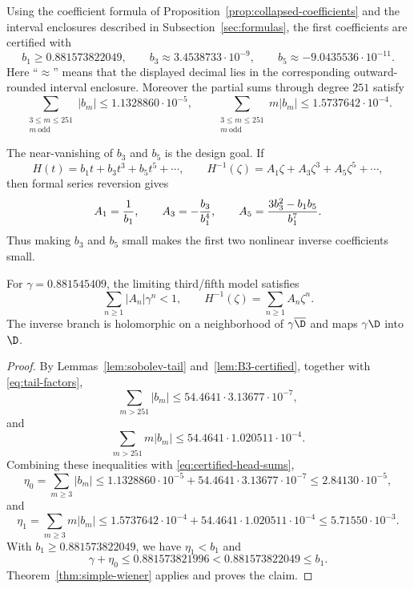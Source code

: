 \begin{lemma}\label{lem:certified-head}
Using the coefficient formula of Proposition~\ref{prop:collapsed-coefficients} and the interval enclosures described in Subsection~\ref{sec:formulas}, the first coefficients are certified with
\[
  b_1\ge0.881573822049,
  \qquad
  b_3\approx3.4538733\cdot10^{-9},
  \qquad
  b_5\approx-9.0435536\cdot10^{-11}.
\]
Here ``$\approx$'' means that the displayed decimal lies in the corresponding outward-rounded interval enclosure.
Moreover the partial sums through degree $251$ satisfy
\begin{equation}\label{eq:certified-head-sums}
  \sum_{\substack{3\le m\le251\\m\ \mathrm{odd}}}|b_m|\le1.1328860\cdot10^{-5},
  \qquad
  \sum_{\substack{3\le m\le251\\m\ \mathrm{odd}}}m|b_m|\le1.5737642\cdot10^{-4}.
\end{equation}
\end{lemma}

The near-vanishing of $b_3$ and $b_5$ is the design goal.  If
\[
  H(t)=b_1t+b_3t^3+b_5t^5+\cdots,
  \qquad
  H^{-1}(\zeta)=A_1\zeta+A_3\zeta^3+A_5\zeta^5+\cdots,
\]
then formal series reversion gives
\begin{equation}\label{eq:low-inverse}
  A_1={1\over b_1},
  \qquad
  A_3=-{b_3\over b_1^4},
  \qquad
  A_5={3b_3^2-b_1b_5\over b_1^7}.
\end{equation}
Thus making $b_3$ and $b_5$ small makes the first two nonlinear inverse coefficients small.

\begin{proposition}\label{prop:limiting-admissibility}
For $\gamma=0.881545409$, the limiting third/fifth model satisfies
\[
  \sum_{n\ge1}|A_n|\gamma^n<1,
  \qquad H^{-1}(\zeta)=\sum_{n\ge1}A_n\zeta^n.
\]
The inverse branch is holomorphic on a neighborhood of $\gamma\overline\D$ and maps $\gamma\D$ into $\D$.
\end{proposition}

\begin{proof}
By Lemmas~\ref{lem:sobolev-tail} and~\ref{lem:B3-certified}, together with \eqref{eq:tail-factors},
\[
  \sum_{m>251}|b_m|
  \le 54.4641\cdot3.13677\cdot10^{-7},
\]
and
\[
  \sum_{m>251}m|b_m|
  \le 54.4641\cdot1.020511\cdot10^{-4}.
\]
Combining these inequalities with \eqref{eq:certified-head-sums},
\[
  \eta_0=\sum_{m\ge3}|b_m|
  \le1.1328860\cdot10^{-5}+54.4641\cdot3.13677\cdot10^{-7}
  \le2.84130\cdot10^{-5},
\]
and
\[
  \eta_1=\sum_{m\ge3}m|b_m|
  \le1.5737642\cdot10^{-4}+54.4641\cdot1.020511\cdot10^{-4}
  \le5.71550\cdot10^{-3}.
\]
With $b_1\ge0.881573822049$, we have $\eta_1<b_1$ and
\[
  \gamma+\eta_0\le0.881573821996<0.881573822049\le b_1.
\]
Theorem~\ref{thm:simple-wiener} applies and proves the claim.
\end{proof}

